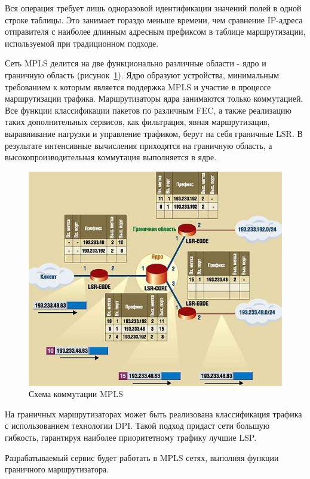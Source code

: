 Вся операция требует лишь одноразовой идентификации значений полей в одной строке таблицы. Это занимает гораздо меньше времени, чем сравнение IP-адреса отправителя с наиболее длинным адресным префиксом в таблице маршрутизации, используемой при традиционном подходе.

Сеть MPLS делится на две функционально различные области - ядро и граничную область (рисунок~\ref{pic:mpls_net_example}). Ядро образуют устройства, минимальным требованием к которым является поддержка MPLS и участие в процессе маршрутизации трафика. Маршрутизаторы ядра занимаются только коммутацией. Все функции классификации пакетов по различным FEC, а также реализацию таких дополнительных сервисов, как фильтрация, явная маршрутизация, выравнивание нагрузки и управление трафиком, берут на себя граничные LSR.  В результате интенсивные вычисления приходятся на граничную область, а высокопроизводительная коммутация выполняется в ядре.
\begin{figure}
\centering
\includegraphics[scale=0.55]{pictures/mpls_net_example}
\caption{Схема коммутации MPLS}
\label{pic:mpls_net_example}
\end{figure}

На граничных маршрутизаторах может быть реализована классификация трафика с использованием технологии DPI. Такой подход придаст сети большую гибкость, гарантируя наиболее приоритетному трафику лучшие LSP.

Разрабатываемый сервис будет работать в MPLS сетях, выполняя функции граничного маршрутизатора.

